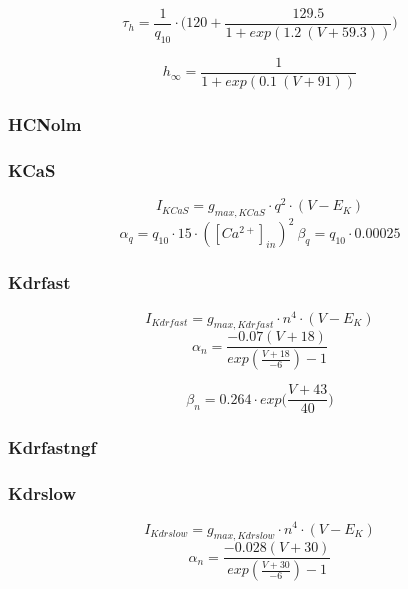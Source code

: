 \documentclass[12pt]{article}
\begin{document}
\begin{equation}
\tau_{h} = \frac{1}{q_{10}} \cdot \Bigg(120 + \frac{129.5}{1 + exp(1.2 \ (V + 59.3))} \Bigg)
\end{equation}

\begin{equation}
h_{\infty} =  \frac{1}{1 + exp(0.1 \ (V + 91))}
\end{equation}

\subsubsection{HCNolm}


\subsubsection{KCaS}
\begin{equation}
I_{KCaS} = g_{max, KCaS} \cdot q^2 \cdot (V - E_K)
\end{equation}
\begin{equation}
\alpha_q = q_{10} \cdot 15 \cdot ([Ca^{2+}]_{in})^2 \  \beta_q = q_{10} \cdot 0.00025
\end{equation}

\subsubsection{Kdrfast}
\begin{equation}
I_{Kdrfast} = g_{max, Kdrfast} \cdot n^4 \cdot (V - E_K)
\end{equation}
\begin{equation}
\alpha_n = \frac{-0.07(V + 18)}{exp(\frac{V + 18}{-6}) - 1}
\end{equation}

\begin{equation}
\beta_n = 0.264 \cdot exp \Big( \frac{V + 43}{40} \Big)
\end{equation}

\subsubsection{Kdrfastngf}


\subsubsection{Kdrslow}
\begin{equation}
I_{Kdrslow} = g_{max, Kdrslow} \cdot n^4 \cdot (V - E_K)
\end{equation}
\begin{equation}
\alpha_n = \frac{-0.028(V + 30)}{exp(\frac{V + 30}{-6}) - 1}
\end{equation}
\end{document}
